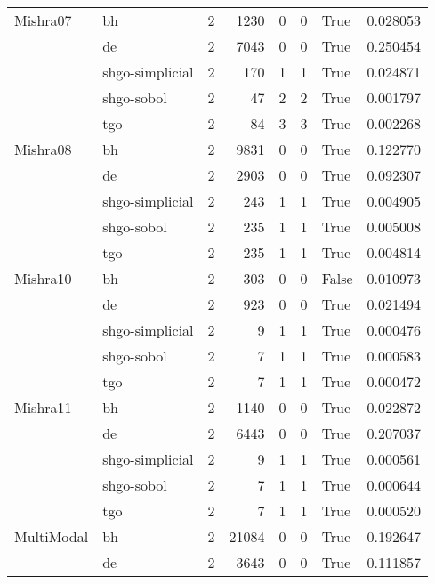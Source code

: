 \begin{longtable}{llrrrrlr}
Mishra07 & bh &     2 &     1230 &      0 &       0 &    True &    0.028053 \\
         & de &     2 &     7043 &      0 &       0 &    True &    0.250454 \\
         & shgo-simplicial &     2 &      170 &      1 &       1 &    True &    0.024871 \\
         & shgo-sobol &     2 &       47 &      2 &       2 &    True &    0.001797 \\
         & tgo &     2 &       84 &      3 &       3 &    True &    0.002268 \\
Mishra08 & bh &     2 &     9831 &      0 &       0 &    True &    0.122770 \\
         & de &     2 &     2903 &      0 &       0 &    True &    0.092307 \\
         & shgo-simplicial &     2 &      243 &      1 &       1 &    True &    0.004905 \\
         & shgo-sobol &     2 &      235 &      1 &       1 &    True &    0.005008 \\
         & tgo &     2 &      235 &      1 &       1 &    True &    0.004814 \\
Mishra10 & bh &     2 &      303 &      0 &       0 &   False &    0.010973 \\
         & de &     2 &      923 &      0 &       0 &    True &    0.021494 \\
         & shgo-simplicial &     2 &        9 &      1 &       1 &    True &    0.000476 \\
         & shgo-sobol &     2 &        7 &      1 &       1 &    True &    0.000583 \\
         & tgo &     2 &        7 &      1 &       1 &    True &    0.000472 \\
Mishra11 & bh &     2 &     1140 &      0 &       0 &    True &    0.022872 \\
         & de &     2 &     6443 &      0 &       0 &    True &    0.207037 \\
         & shgo-simplicial &     2 &        9 &      1 &       1 &    True &    0.000561 \\
         & shgo-sobol &     2 &        7 &      1 &       1 &    True &    0.000644 \\
         & tgo &     2 &        7 &      1 &       1 &    True &    0.000520 \\
MultiModal & bh &     2 &    21084 &      0 &       0 &    True &    0.192647 \\
         & de &     2 &     3643 &      0 &       0 &    True &    0.111857 \\

\end{longtable}
